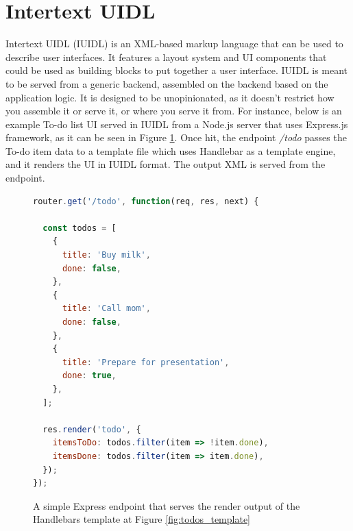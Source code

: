 
\section{Intertext UIDL} \label{intertextUIDL}

Intertext UIDL (IUIDL) is an XML-based markup language that can be used to describe user interfaces. It features a layout system and UI components that could be used as building blocks to put together a user interface. IUIDL is meant to be served from a generic backend, assembled on the backend based on the application logic. It is designed to be unopinionated, as it doesn't restrict how you assemble it or serve it, or where you serve it from. For instance, below is an example To-do list UI served in IUIDL from a Node.js server that uses Express.js framework, as it can be seen in Figure \ref{fig:todos_js}. Once hit, the endpoint \textit{/todo} passes the To-do item data to a template file which uses Handlebar as a template engine, and it renders the UI in IUIDL format. The output XML is served from the endpoint.

\begin{figure}
\begin{minipage}{\linewidth}
\begin{lstlisting}[language=javascript]
router.get('/todo', function(req, res, next) {

  const todos = [
    {
      title: 'Buy milk',
      done: false,
    },
    {
      title: 'Call mom',
      done: false,
    },
    {
      title: 'Prepare for presentation',
      done: true,
    },
  ];

  res.render('todo', {
    itemsToDo: todos.filter(item => !item.done),
    itemsDone: todos.filter(item => item.done),
  });
});
\end{lstlisting}
\end{minipage}
\caption{A simple Express endpoint that serves the render output of the Handlebars template at Figure \ref{fig:todos_template}}%
\label{fig:todos_js}%
\end{figure}

